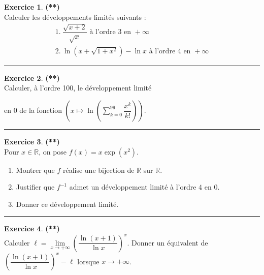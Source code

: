 \documentclass[a4paper,11pt]{article}
\theoremstyle{definition}
\newtheorem{exo}{Exercice} %
\begin{document}
\newpage
\raggedright

\begin{minipage}{1\linewidth}
	\begin{minipage}[t]{0.48\linewidth}
		\raggedright
		
		

				
		\begin{exo}\textbf{(**)}\quad\\[0.2cm]
			Calculer les développements limités suivants :
			$$\begin{array}{l}
			 1. \ \dfrac{\sqrt{x+2}}{\sqrt x}\textrm{ à l'ordre 3 en }+\infty\\
			\displaystyle 2. \ \ln\left(x+\sqrt {1+x^2}\right)-\ln x\textrm{ à l'ordre 4 en }+\infty
			\end{array}$$
			
			\centering
			\rule{1\linewidth}{0.6pt}
		\end{exo}
		
		
		
		\begin{exo}\textbf{(**)}\quad\\[0.2cm]
			Calculer, à l'ordre 100, le développement limité
			
			en 0 de la fonction $\displaystyle \left(x\mapsto\ln\left(\sum_{k=0}^{99}\dfrac{x^k}{k!}\right)\right)$.
			
			\centering
			\rule{1\linewidth}{0.6pt}
		\end{exo}
		
		\begin{exo}\textbf{(**)}\quad\\[0.2cm]
			Pour $x\in\mathbb R$, on pose $f(x)=x\exp(x^2)$.
			\begin{enumerate}
				\item Montrer que $f$ réalise une bijection de $\mathbb R$ sur $\mathbb R$.
				\item Justifier que $f^{-1}$ admet un développement limité à l'ordre $4$ en $0$.
				\item Donner ce développement limité.
			\end{enumerate}
			
			
			\centering
			\rule{1\linewidth}{0.6pt}
		\end{exo}
		
		\begin{exo}\textbf{(**)}\quad\\[0.2cm]
			Calculer $\ell = \lim\limits_{x\to+\infty}\left(\dfrac{\ln(x+1)}{\ln x}\right)^x.$ 
			Donner un équivalent de 
			$\left(\dfrac{\ln(x+1)}{\ln x}\right)^x - \ell$ lorsque $x \to +\infty$.
			

\end{exo}
\end{minipage}
\end{minipage}
\end{document}
